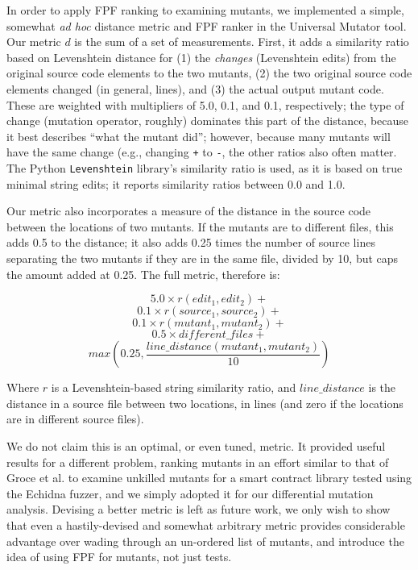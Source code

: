 In order to apply FPF ranking to examining mutants, we implemented a
simple, somewhat \emph{ad hoc} distance metric and FPF ranker in the
Universal Mutator \cite{universalmutator} tool.  Our metric $d$ is
the sum of a set of measurements.  First, it adds a similarity
ratio based on Levenshtein distance \cite{lev} for (1) the \emph{changes} (Levenshtein edits) from
the original source code elements to
the two mutants,  (2) the two original source code elements changed (in
general, lines), and (3) the actual output mutant code.  These are
weighted with multipliers of 5.0, 0.1, and 0.1, respectively; the type
of change (mutation operator, roughly) dominates this part of the
distance, because it best describes ``what the mutant did''; however,
because many mutants will have the same change (e.g., changing {\tt +}
to {\tt -}, the other ratios also often matter.  The Python
{\tt Levenshtein} library's similarity ratio is used, as it is based
on true minimal string edits; it reports similarity ratios between 0.0
and 1.0.

Our metric also incorporates a measure of the distance in the source
code between the locations of two mutants.  If the mutants are to
different files, this adds 0.5 to the distance; it also adds 0.25
times the number of source lines separating the two mutants if they
are in the same file, divided by 10, but caps the amount added at
0.25.  The full metric, therefore is:

$$ 5.0 \times r(\mathit{edit}_1, \mathit{edit}_2) +$$
$$0.1 \times r(\mathit{source}_1, \mathit{source}_2) +$$
$$0.1 \times r(\mathit{mutant}_1, \mathit{mutant}_2) +$$
$$0.5 \times \mathit{different\_files} +$$
$$max(0.25, \frac{\mathit{line\_distance}(\mathit{mutant}_1, \mathit{mutant}_2)}{10})$$

\noindent Where $r$ is a Levenshtein-based string similarity ratio,
and $\mathit{line\_distance}$ is the distance in a source file between
two locations, in lines (and zero if the locations are in different
source files).

We do not claim this is an optimal, or even tuned, metric.  It
provided useful results for a different problem, ranking mutants in an
effort similar to that of Groce et
al. \cite{groce2015verified,groce2018verified} to examine unkilled
mutants for a smart contract library tested using the Echidna fuzzer,
and we simply adopted it for our differential mutation analysis.
Devising a better metric is left as future work, we only wish to show
that even a hastily-devised and somewhat arbitrary metric provides
considerable advantage over wading through an un-ordered list of
mutants, and introduce the idea of using FPF for mutants, not just tests.